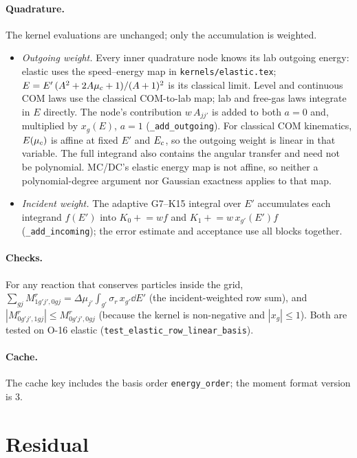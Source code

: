 \documentclass[11pt]{article}
\begin{document}
\paragraph{Quadrature.} The kernel evaluations are unchanged; only the accumulation
is weighted.
\begin{itemize}
  \item \emph{Outgoing weight.} Every inner quadrature node knows its lab outgoing
  energy: elastic uses the speed--energy map in \texttt{kernels/elastic.tex};
  $E = E'\,(A^2+2A\mu_{c}+1)/(A+1)^2$ is its classical limit. Level and continuous
  COM laws use the classical COM-to-lab map; lab and free-gas laws integrate in $E$
  directly. The
  node's contribution $w\,A_{jj'}$ is added to both $a=0$ and, multiplied by
  $x_g(E)$, $a=1$ (\texttt{\_add\_outgoing}). For classical COM kinematics,
  $E(\mu_{c})$ is affine at fixed $E'$ and $E_{c}$, so the outgoing weight is linear
  in that variable. The full integrand also contains the angular transfer and
  need not be polynomial. MC/DC's elastic energy map is not affine, so neither
  a polynomial-degree argument nor Gaussian exactness applies to that map.
  \item \emph{Incident weight.} The adaptive G7--K15 integral over $E'$ accumulates
  each integrand $f(E')$ into $K_0 \mathrel{+}= w f$ and
  $K_1 \mathrel{+}= w\,x_{g'}(E') f$ (\texttt{\_add\_incoming}); the error estimate and
  acceptance use all blocks together.
\end{itemize}

\paragraph{Checks.} For any reaction that conserves particles inside the grid,
$\sum_{gj}M^r_{1g'j',0gj} = \Delta\mu_{j'}\int_{g'}\sigma_r\,x_{g'}\dd E'$ (the
incident-weighted row sum), and $|M^r_{0g'j',1gj}|\le M^r_{0g'j',0gj}$ (because the
kernel is non-negative and $|x_g|\le 1$). Both are tested on O-16 elastic
(\texttt{test\_elastic\_row\_linear\_basis}).

\paragraph{Cache.} The cache key includes the basis order \texttt{energy\_order};
the moment format version is 3.

\section{Residual}
\end{document}
